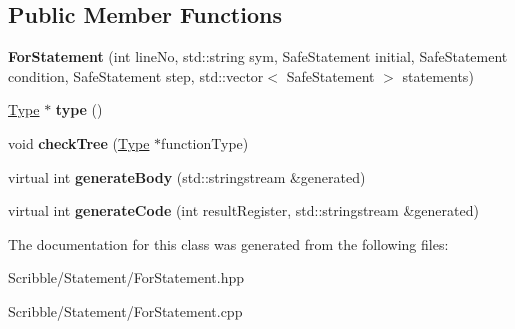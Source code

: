 \subsection*{Public Member Functions}
\begin{DoxyCompactItemize}
\item 
\hypertarget{class_for_statement_ad958b4a0b872fa95bc748138b0ad214a}{{\bfseries For\-Statement} (int line\-No, std\-::string sym, Safe\-Statement initial, Safe\-Statement condition, Safe\-Statement step, std\-::vector$<$ Safe\-Statement $>$ statements)}\label{class_for_statement_ad958b4a0b872fa95bc748138b0ad214a}

\item 
\hypertarget{class_for_statement_ab63bcca2f560a218addd9f3516d6cc1d}{\hyperlink{class_type}{Type} $\ast$ {\bfseries type} ()}\label{class_for_statement_ab63bcca2f560a218addd9f3516d6cc1d}

\item 
\hypertarget{class_for_statement_a93d2eb052ed1db9d7de5a52eb5b2274f}{void {\bfseries check\-Tree} (\hyperlink{class_type}{Type} $\ast$function\-Type)}\label{class_for_statement_a93d2eb052ed1db9d7de5a52eb5b2274f}

\item 
\hypertarget{class_for_statement_a924e705bfbb2ae9d0635274702a0e47e}{virtual int {\bfseries generate\-Body} (std\-::stringstream \&generated)}\label{class_for_statement_a924e705bfbb2ae9d0635274702a0e47e}

\item 
\hypertarget{class_for_statement_a98c9d6f8d44a0604b171abeffa3fbfa8}{virtual int {\bfseries generate\-Code} (int result\-Register, std\-::stringstream \&generated)}\label{class_for_statement_a98c9d6f8d44a0604b171abeffa3fbfa8}

\end{DoxyCompactItemize}


The documentation for this class was generated from the following files\-:\begin{DoxyCompactItemize}
\item 
Scribble/\-Statement/For\-Statement.\-hpp\item 
Scribble/\-Statement/For\-Statement.\-cpp\end{DoxyCompactItemize}
